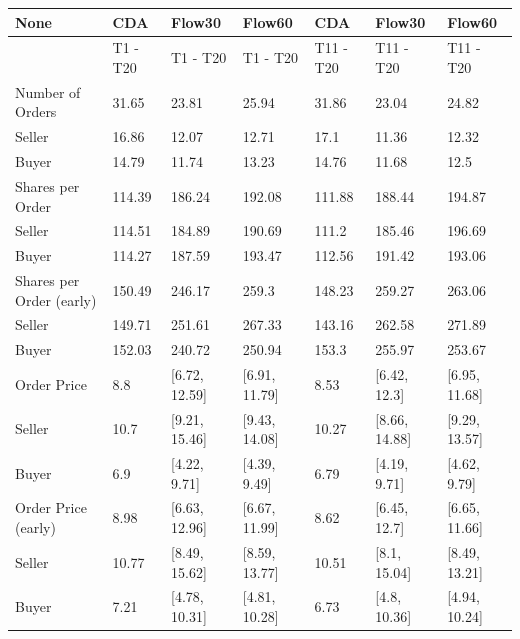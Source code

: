 \begin{tabular}{lllllll}
\hline
 None                     & CDA      & Flow30        & Flow60        & CDA       & Flow30        & Flow60        \\
\hline
                          & T1 - T20 & T1 - T20      & T1 - T20      & T11 - T20 & T11 - T20     & T11 - T20     \\
 Number of Orders         & 31.65    & 23.81         & 25.94         & 31.86     & 23.04         & 24.82         \\
 Seller                   & 16.86    & 12.07         & 12.71         & 17.1      & 11.36         & 12.32         \\
 Buyer                    & 14.79    & 11.74         & 13.23         & 14.76     & 11.68         & 12.5          \\
 Shares per Order         & 114.39   & 186.24        & 192.08        & 111.88    & 188.44        & 194.87        \\
 Seller                   & 114.51   & 184.89        & 190.69        & 111.2     & 185.46        & 196.69        \\
 Buyer                    & 114.27   & 187.59        & 193.47        & 112.56    & 191.42        & 193.06        \\
 Shares per Order (early) & 150.49   & 246.17        & 259.3         & 148.23    & 259.27        & 263.06        \\
 Seller                   & 149.71   & 251.61        & 267.33        & 143.16    & 262.58        & 271.89        \\
 Buyer                    & 152.03   & 240.72        & 250.94        & 153.3     & 255.97        & 253.67        \\
 Order Price              & 8.8      & [6.72, 12.59] & [6.91, 11.79] & 8.53      & [6.42, 12.3]  & [6.95, 11.68] \\
 Seller                   & 10.7     & [9.21, 15.46] & [9.43, 14.08] & 10.27     & [8.66, 14.88] & [9.29, 13.57] \\
 Buyer                    & 6.9      & [4.22, 9.71]  & [4.39, 9.49]  & 6.79      & [4.19, 9.71]  & [4.62, 9.79]  \\
 Order Price (early)      & 8.98     & [6.63, 12.96] & [6.67, 11.99] & 8.62      & [6.45, 12.7]  & [6.65, 11.66] \\
 Seller                   & 10.77    & [8.49, 15.62] & [8.59, 13.77] & 10.51     & [8.1, 15.04]  & [8.49, 13.21] \\
 Buyer                    & 7.21     & [4.78, 10.31] & [4.81, 10.28] & 6.73      & [4.8, 10.36]  & [4.94, 10.24] \\

\end{tabular}
